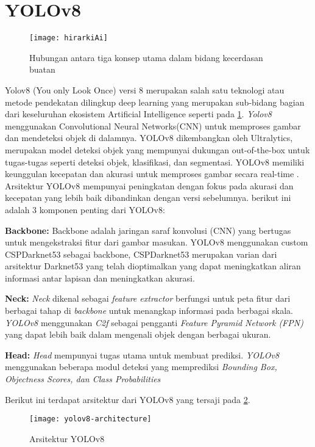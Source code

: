 \section{YOLOv8}
\begin{figure}[H]
	\centering
	\texttt{[image: hirarkiAi]}
	\caption{Hubungan antara tiga konsep utama dalam bidang kecerdasan buatan}
	\label{fig:hirarki}
\end{figure}
Yolov8 (You only Look Once)  versi 8 merupakan salah satu teknologi atau metode pendekatan dilingkup deep learning yang merupakan sub-bidang bagian dari keseluruhan ekosistem Artificial Intelligence seperti pada \cref{fig:hirarki}. \textit{Yolov8} menggunakan Convolutional Neural Networks(CNN) untuk memproses gambar dan mendeteksi objek di dalamnya. YOLOv8 dikembangkan oleh Ultralytics, merupakan model deteksi objek yang mempunyai dukungan out-of-the-box untuk tugas-tugas seperti deteksi objek, klasifikasi, dan segmentasi. YOLOv8 memiliki keunggulan kecepatan dan akurasi untuk memproses gambar secara real-time \cite{roboflowWhatYOLOv8}. Arsitektur YOLOv8 mempunyai peningkatan dengan fokus pada akurasi dan kecepatan yang lebih baik dibandinkan dengan versi sebelumnya. berikut ini adalah 3 komponen penting dari YOLOv8:
\begin{packed_item}
	\item \textbf{Backbone:}
	Backbone adalah  jaringan saraf konvolusi (CNN) yang bertugas untuk mengekstraksi fitur dari gambar masukan. YOLOv8 menggunakan custom CSPDarknet53 sebagai backbone,  CSPDarknet53 merupakan varian dari  arsitektur Darknet53 yang telah dioptimalkan yang dapat meningkatkan aliran informasi antar lapisan dan meningkatkan akurasi.
	\item \textbf{Neck:} 
	\textit{Neck} dikenal sebagai \textit{feature extractor} berfungsi untuk peta fitur dari berbagai tahap di \textit{backbone} untuk menangkap informasi pada berbagai skala. \textit{YOLOv8} menggunakan \textit{C2f} sebagai pengganti \textit{Feature Pyramid Network (FPN)} yang dapat lebih baik dalam mengenali objek dengan berbagai ukuran.  
	\item \textbf{Head:}
	\textit{Head} mempunyai tugas utama untuk membuat prediksi. \textit{YOLOv8} menggunakan beberapa modul deteksi yang memprediksi \textit{Bounding Box, Objectness Scores, dan Class Probabilities}
\end{packed_item}	

Berikut ini terdapat  arsitektur dari YOLOv8 yang tersaji pada \cref{fig:yolov8}.
\begin{figure}[H]
	\centering
	\texttt{[image: yolov8-architecture]}
	\caption{Arsitektur YOLOv8}
	\label{fig:yolov8}
\end{figure}

